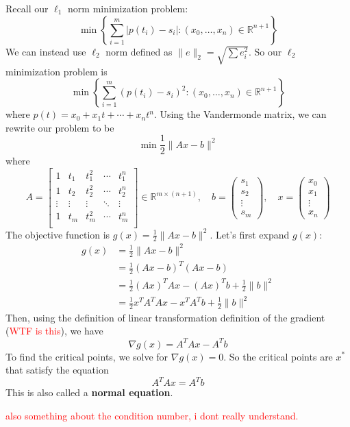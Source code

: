 \begin{problem}
  Recall our $\ell_1$ norm minimization problem:
  $$\min \left\{\sum^m_{i=1}|p(t_i) - s_i| : (x_0,\ldots,x_n) \in \mathbb R^{n+1}\right\}$$
  We can instead use $\ell_2$ norm defined as $\|e\|_2 = \sqrt{\sum e_i^2}$. So our $\ell_2$ minimization problem is $$\min \left\{\sum^m_{i=1}(p(t_i) - s_i)^2 : (x_0,\ldots,x_n) \in \mathbb R^{n+1}\right\}$$ where $p(t) = x_0 + x_1t + \cdots + x_nt^n$. Using the Vandermonde matrix, we can rewrite our problem to be
  $$\min \frac{1}{2} \|Ax - b\|^2$$ where $$A = \begin{bmatrix}
    1 & t_1 & t_1^2 & \cdots & t_1^n\\
    1 & t_2 & t_2^2 & \cdots & t_2^n\\
    \vdots & \vdots & \vdots & \ddots & \vdots\\
    1 & t_m & t_m^2 & \cdots & t_m^n\\
  \end{bmatrix} \in \mathbb R^{m \times (n+1)}, \quad b = \begin{pmatrix}
    s_1 \\ s_2 \\ \vdots \\ s_m
  \end{pmatrix}, \quad x = \begin{pmatrix}
    x_0 \\ x_1 \\ \vdots \\ x_n
  \end{pmatrix}$$
  The objective function is $g(x) = \frac{1}{2}\|Ax - b\|^2$. Let's first expand $g(x)$:
  \begin{align*}
    g(x) &= \frac{1}{2} \|Ax - b \|^2 \\
    &= \frac{1}{2}(Ax - b)^T (Ax - b) \\
    &= \frac{1}{2} (Ax)^T Ax - (Ax)^Tb + \frac{1}{2} \|b \|^2 \\
    &= \frac{1}{2} x^T A^T Ax - x^T A^T b + \frac{1}{2} \|b \|^2 
  \end{align*}
  Then, using the definition of linear transformation definition of the gradient (\textcolor{red}{WTF is this}), we have $$\nabla g(x) = A^T Ax - A^T b$$
  To find the critical points, we solve for $\nabla g(x) = 0$. So the critical points are $x^*$ that satisfy the equation
  $$A^TAx = A^Tb$$
  This is also called a \textbf{normal equation}.

  \textcolor{red}{also something about the condition number, i dont really understand.}
\end{problem}
